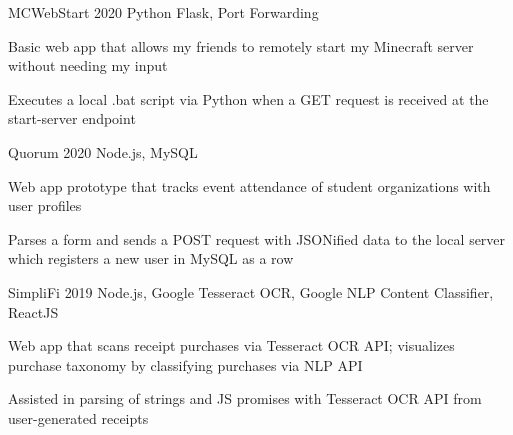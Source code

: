 
\begin{cvprojects}

  \cvproject
  {MCWebStart} %
  {\href{https://github.com/KevinIsMyName/MCWebStart}{\faGithubSquare\acvHeaderIconSep\@KevinIsMyName}} %
  {2020} %
  {Python Flask, Port Forwarding} %
  {
    \begin{cvitems}
      \item {Basic web app that allows my friends to remotely start my Minecraft server without needing my input}
      \item {Executes a local .bat script via Python when a GET request is received at the start-server endpoint}
    \end{cvitems}
  }

  \cvproject
  {Quorum}
  {\href{https://github.com/KevinIsMyName/Quorum}{\faGithubSquare\acvHeaderIconSep\@KevinIsMyName}}
  {2020}
  {Node.js, MySQL}
  {
    \begin{cvitems}
      \item {Web app prototype that tracks event attendance of student organizations with user profiles}
      \item {Parses a form and sends a POST request with JSONified data to the local server which registers a new user in MySQL as a row}
    \end{cvitems}
  }

  \cvproject
  {SimpliFi}
  {\href{https://github.com/unitehenry/simply-finance}{\faGithubSquare\acvHeaderIconSep{}}}
  {2019}
  {Node.js, Google Tesseract OCR, Google NLP Content Classifier, ReactJS}
  {
    \begin{cvitems}
      \item {Web app that scans receipt purchases via Tesseract OCR API; visualizes purchase taxonomy by classifying purchases via NLP API}
      \item {Assisted in parsing of strings and JS promises with Tesseract OCR API from user-generated receipts}
    \end{cvitems}
  }


\end{cvprojects}
